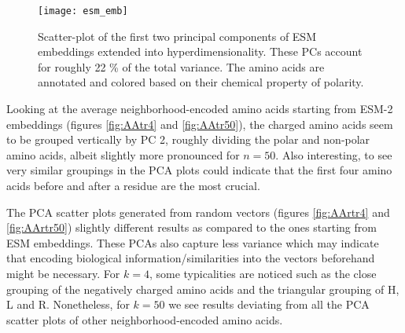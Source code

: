 \begin{figure}[H]
    \centering
    \texttt{[image: esm\_emb]}
    \caption{Scatter-plot of the first two principal components of ESM embeddings extended into hyperdimensionality. These PCs account for roughly 22 \% of the total variance. The amino acids are annotated and colored based on their chemical property of polarity.}\label{fig:AAesm}
\end{figure}

Looking at the average neighborhood-encoded amino acids starting from ESM-2 embeddings (figures \ref{fig:AAtr4} and \ref{fig:AAtr50}), the charged amino acids seem to be grouped vertically by PC 2, roughly dividing the polar and non-polar amino acids, albeit slightly more pronounced for $n = 50$. Also interesting, to see very similar groupings in the PCA plots could indicate that the first four amino acids before and after a residue are the most crucial.

The PCA scatter plots generated from random vectors (figures \ref{fig:AArtr4} and \ref{fig:AArtr50}) slightly different results as compared to the ones starting from ESM embeddings. These PCAs also capture less variance which may indicate that encoding biological information/similarities into the vectors beforehand might be necessary. For $k = 4$, some typicalities are noticed such as the close grouping of the negatively charged amino acids and the triangular grouping of H, L and R. Nonetheless, for $k = 50$ we see results deviating from all the PCA scatter plots of other neighborhood-encoded amino acids.

